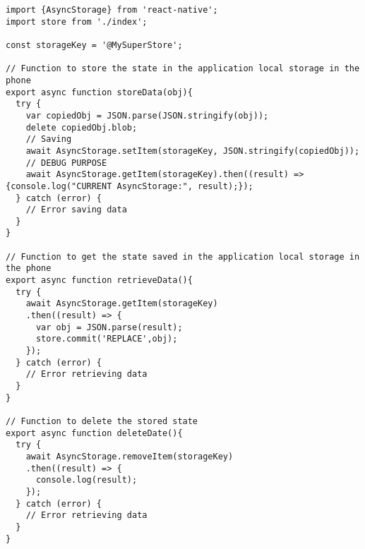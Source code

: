 \medskip
\begin{lstlisting}[style=htmlcssjs]
import {AsyncStorage} from 'react-native';
import store from './index';

const storageKey = '@MySuperStore';

// Function to store the state in the application local storage in the phone
export async function storeData(obj){
  try {
    var copiedObj = JSON.parse(JSON.stringify(obj));
    delete copiedObj.blob;
    // Saving
    await AsyncStorage.setItem(storageKey, JSON.stringify(copiedObj));
    // DEBUG PURPOSE
    await AsyncStorage.getItem(storageKey).then((result) => {console.log("CURRENT AsyncStorage:", result);});
  } catch (error) {
    // Error saving data
  }
}

// Function to get the state saved in the application local storage in the phone
export async function retrieveData(){
  try {
    await AsyncStorage.getItem(storageKey)
    .then((result) => {
      var obj = JSON.parse(result);
      store.commit('REPLACE',obj);
    });
  } catch (error) {
    // Error retrieving data
  }
}

// Function to delete the stored state
export async function deleteDate(){
  try {
    await AsyncStorage.removeItem(storageKey)
    .then((result) => {
      console.log(result);
    });
  } catch (error) {
    // Error retrieving data
  }
}
\end{lstlisting}